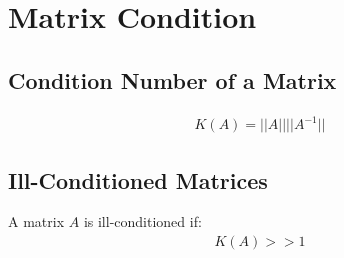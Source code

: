 \section{Matrix Condition}

	\subsection{Condition Number of a Matrix}
		\begin{align}
			K(A) = ||A||||A^{-1}||
		\end{align}

	\subsection{Ill-Conditioned Matrices}
		A matrix $A$ is ill-conditioned if:
		\begin{align}
			K(A) >> 1
		\end{align}
